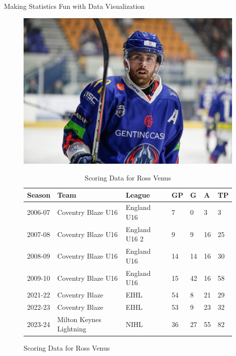 \documentclass[final]{beamer}
\begin{document}
\begin{frame}[t]{}
\begin{columns}[t]
\begin{column}{.3\textwidth}
\begin{block}{Making Statistics Fun with Data Visualization}
\begin{figure}[htbp]
					\begin{minipage}[t][0.4\textwidth][t]{0.3\textwidth}
						\hspace*{5mm}
						\vspace{0cm}
						\includegraphics[width=0.9\linewidth]{./images/3-1-1-RossVenus}
						\caption{Ross Venus}
						\vspace{-0.3cm}
						\caption*{\textit{\centering\scriptsize Photo: Scott Wiggins}}
					\end{minipage}
					\hfill
					\begin{minipage}{0.65\textwidth}
						\vspace{-2cm}
						\begin{table}
							\centering
							\caption{Scoring Data for Ross Venus}
							{\footnotesize
								\begin{tabular}{|l|l|l|l|l|l|l|}
									\hline
									Season  & Team                    & League        & GP & G  & A  & TP \\ \hline
									2006-07 & Coventry Blaze U16      & England U16   & 7  & 0  & 3  & 3  \\
									2007-08 & Coventry Blaze U16      & England U16 2 & 9  & 9  & 16 & 25 \\
									2008-09 & Coventry Blaze U16      & England U16   & 14 & 14 & 16 & 30 \\
									2009-10 & Coventry Blaze U16      & England U16   & 15 & 42 & 16 & 58 \\
									2021-22 & Coventry Blaze          & EIHL          & 54 & 8  & 21 & 29 \\
									2022-23 & Coventry Blaze          & EIHL          & 53 & 9  & 23 & 32 \\
									2023-24 & Milton Keynes Lightning & NIHL          & 36 & 27 & 55 & 82 \\ \hline
								\end{tabular}
							}
						\end{table}
					\end{minipage}
					

\end{figure}
\end{block}
\end{column}
\end{columns}
\end{frame}
\end{document}
